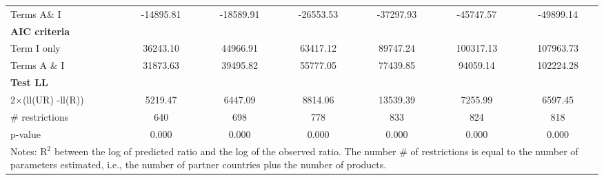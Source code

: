 \documentclass[a4paper,11pt]{article}
\begin{document}
\begin{table}[htbp]
\begin{center}
\begin{tabular}{l|cccccc}
Terms A\& I & \multicolumn{1}{c}{-14895.81} & \multicolumn{1}{c}{-18589.91} & \multicolumn{1}{c}{-26553.53} & \multicolumn{1}{c}{-37297.93} & \multicolumn{1}{c}{-45747.57} & \multicolumn{1}{c}{-49899.14}  \\
\textbf{AIC criteria} & \multicolumn{1}{c}{} & \multicolumn{1}{c}{} & \multicolumn{1}{c}{} &       & \multicolumn{1}{c}{}  \\
Term I only & \multicolumn{1}{c}{36243.10} & \multicolumn{1}{c}{44966.91} & \multicolumn{1}{c}{63417.12} & \multicolumn{1}{c}{89747.24} & \multicolumn{1}{c}{100317.13} & \multicolumn{1}{c}{107963.73} \\
Terms A \& I & \multicolumn{1}{c}{31873.63} & \multicolumn{1}{c}{39495.82} & \multicolumn{1}{c}{55777.05} & \multicolumn{1}{c}{77439.85} & \multicolumn{1}{c}{94059.14} & \multicolumn{1}{c}{102224.28}  \\
\textbf{Test LL} &       &       &       &       &       &       \\
2$\times$(ll(UR) -ll(R)) & \multicolumn{1}{c}{5219.47} & \multicolumn{1}{c}{6447.09} & \multicolumn{1}{c}{8814.06} & \multicolumn{1}{c}{13539.39} & \multicolumn{1}{c}{7255.99} & \multicolumn{1}{c}{6597.45}  \\
\# restrictions  & \multicolumn{1}{c}{640} & \multicolumn{1}{c}{698} & \multicolumn{1}{c}{778} & \multicolumn{1}{c}{833} & \multicolumn{1}{c}{824} & \multicolumn{1}{c}{818}  \\
p-value & \multicolumn{1}{c}{0.000} & \multicolumn{1}{c}{0.000} & \multicolumn{1}{c}{0.000} & \multicolumn{1}{c}{0.000} & \multicolumn{1}{c}{0.000} & \multicolumn{1}{c}{0.000} \\
\hline\hline
\multicolumn{7}{l}{\parbox[l]{15cm}{ \vspace{7pt}\scriptsize{Notes: R$^{2}$ between the log of predicted ratio and the log of the observed ratio. The number \# of restrictions is equal to the number of parameters estimated, i.e., the number of partner countries plus the number of products.}}}
\end{tabular}%
\end{center}
\end{table}%
\end{document}
